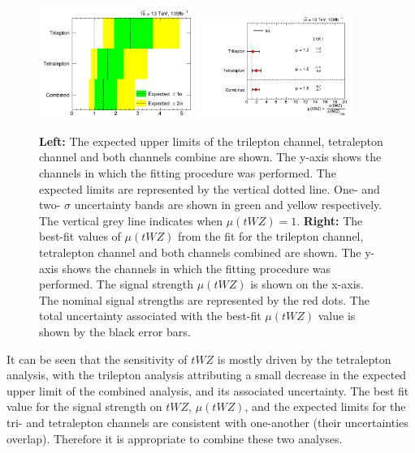 \begin{figure}[h!]
    \centering
    \includegraphics[width=0.45\textwidth]{figures/combined/Limits.png}
     \includegraphics[width=0.45\textwidth]{figures/combined/POI_SigXsecOverSM_.png}
    \caption{\textbf{Left: }The expected upper limits of the trilepton channel, tetralepton channel and both channels combine are shown. The y-axis shows the channels in which the fitting procedure was performed. The expected limits are represented by the vertical dotted line. One- and two- $\sigma$ uncertainty bands are shown in green and yellow respectively. The vertical grey line indicates when $\mu (tWZ) = 1$. \textbf{Right: }The best-fit values of $\mu (tWZ)$ from the fit for the trilepton channel, tetralepton channel and both channels combined are shown. The y-axis shows the channels in which the fitting procedure was performed. The signal strength $\mu (tWZ)$ is shown on the x-axis. The nominal signal strengths are represented by the red dots. The total uncertainty associated with the best-fit $\mu (tWZ)$ value is shown by the black error bars.}
    \label{fig:combinedlimits}
\end{figure}

It can be seen that the sensitivity of $tWZ$ is mostly driven by the tetralepton analysis, with the trilepton analysis attributing a small decrease in the expected upper limit of the combined analysis, and its associated uncertainty. The best fit value for the signal strength on $tWZ$, $\mu (tWZ)$, and the expected limits for the tri- and tetralepton channels are consistent with one-another (their uncertainties overlap). Therefore it is appropriate to combine these two analyses.\\

